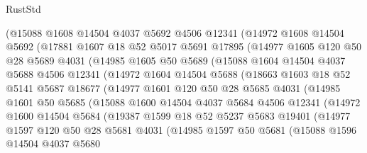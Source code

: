\begin{lexlean}{RustStd}
\begin{coremodule}
      (@15088
        @1608
        @14504
        @4037
        @5692
        @4506
        @12341
        (@14972
          @1608
          @14504
          @5692
          (@17881
            @1607
            @18
            @52
            @5017
            @5691
            @17895
            (@14977
              @1605
              @120
              @50
              @28
              @5689
              @4031
              (@14985
                @1605
                @50
                @5689
                (@15088
                  @1604
                  @14504
                  @4037
                  @5688
                  @4506
                  @12341
                  (@14972
                    @1604
                    @14504
                    @5688
                    (@18663
                      @1603
                      @18
                      @52
                      @5141
                      @5687
                      @18677
                      (@14977
                        @1601
                        @120
                        @50
                        @28
                        @5685
                        @4031
                        (@14985
                          @1601
                          @50
                          @5685
                          (@15088
                            @1600
                            @14504
                            @4037
                            @5684
                            @4506
                            @12341
                            (@14972
                              @1600
                              @14504
                              @5684
                              (@19387
                                @1599
                                @18
                                @52
                                @5237
                                @5683
                                @19401
                                (@14977
                                  @1597
                                  @120
                                  @50
                                  @28
                                  @5681
                                  @4031
                                  (@14985
                                    @1597
                                    @50
                                    @5681
                                    (@15088
                                      @1596
                                      @14504
                                      @4037
                                      @5680

\end{coremodule}
\end{lexlean}
